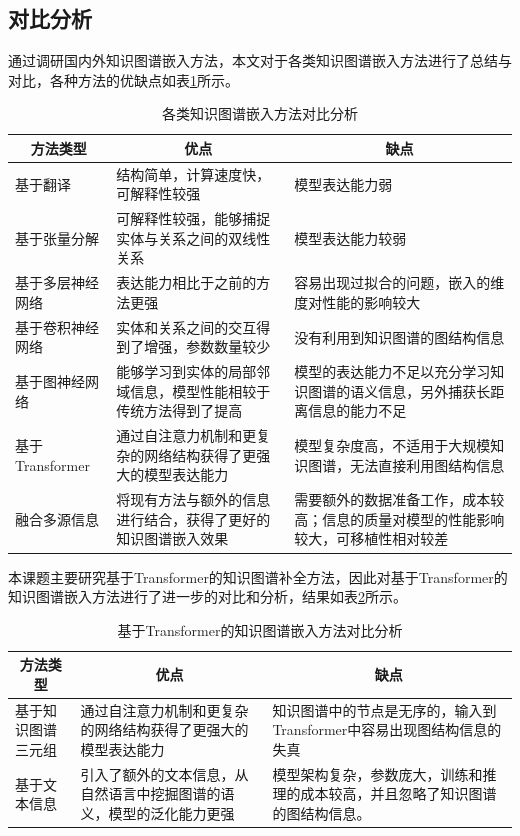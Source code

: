 \subsection{对比分析}
通过调研国内外知识图谱嵌入方法，本文对于各类知识图谱嵌入方法进行了总结与对比，各种方法的优缺点如表\ref{ComparativeAnalysis}所示。
\begin{table}[tbp]
  \renewcommand\arraystretch{1.5}
  \caption{各类知识图谱嵌入方法对比分析}
  \label{ComparativeAnalysis}
  \centering
  
  \begin{tabular}{lp{6cm}p{5cm}}
    \toprule
    \multicolumn{1}{c}{方法类型} & \multicolumn{1}{c}{优点} & \multicolumn{1}{c}{缺点}\\
    \midrule
    基于翻译 & 结构简单，计算速度快，可解释性较强& 模型表达能力弱\\
    基于张量分解 & 可解释性较强，能够捕捉实体与关系之间的双线性关系 & 模型表达能力较弱\\
    基于多层神经网络 & 表达能力相比于之前的方法更强 & 容易出现过拟合的问题，嵌入的维度对性能的影响较大\\
    基于卷积神经网络 & 实体和关系之间的交互得到了增强，参数数量较少&没有利用到知识图谱的图结构信息\\
    基于图神经网络 & 能够学习到实体的局部邻域信息，模型性能相较于传统方法得到了提高 & 模型的表达能力不足以充分学习知识图谱的语义信息，另外捕获长距离信息的能力不足\\
    基于Transformer &通过自注意力机制和更复杂的网络结构获得了更强大的模型表达能力 & 模型复杂度高，不适用于大规模知识图谱，无法直接利用图结构信息\\
    融合多源信息 & 将现有方法与额外的信息进行结合，获得了更好的知识图谱嵌入效果 & 需要额外的数据准备工作，成本较高；信息的质量对模型的性能影响较大，可移植性相对较差\\
    \bottomrule
  \end{tabular}
\end{table}


本课题主要研究基于Transformer的知识图谱补全方法，因此对基于Transformer的知识图谱嵌入方法进行了进一步的对比和分析，结果如表\ref{ComparativeAnalysis_2}所示。

\begin{table}[htbp]
  \renewcommand\arraystretch{1.5}
  \caption{基于Transformer的知识图谱嵌入方法对比分析}
  \label{ComparativeAnalysis_2}
  \centering
  \begin{tabular}{lp{6cm}p{5cm}}
    \toprule
    \multicolumn{1}{c}{方法类型} & \multicolumn{1}{c}{优点} & \multicolumn{1}{c}{缺点}\\
    \midrule
    基于知识图谱三元组 &通过自注意力机制和更复杂的网络结构获得了更强大的模型表达能力 & 知识图谱中的节点是无序的，输入到Transformer中容易出现图结构信息的失真\\
    基于文本信息 & 引入了额外的文本信息，从自然语言中挖掘图谱的语义，模型的泛化能力更强 & 模型架构复杂，参数庞大，训练和推理的成本较高，并且忽略了知识图谱的图结构信息。\\
    \bottomrule
  \end{tabular}
\end{table}

